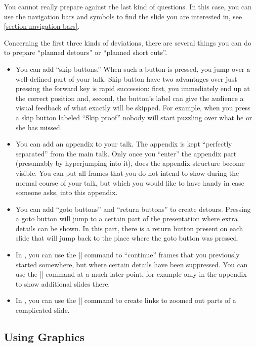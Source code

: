 You cannot really prepare against the last kind of questions. In this case, you can use the navigation bars and symbols to find the slide you are interested in, see \ref{section-navigation-bars}.

Concerning the first three kinds of deviations, there are several things you can do to prepare ``planned detours'' or ``planned short cuts''.
\begin{itemize}
\item
  You can add ``skip buttons.'' When such a button is pressed, you jump over a well-defined part of your talk. Skip button have two advantages over just pressing the forward key is rapid succession: first, you immediately end up at the correct position and, second, the button's label can give the audience a visual feedback of what exactly will be skipped. For example, when you press a skip button labeled ``Skip proof'' nobody will start puzzling over what he or she has missed.
\item
  You can add an appendix to your talk. The appendix is kept ``perfectly separated'' from the main talk. Only once you ``enter'' the appendix part (presumably by hyperjumping into it), does the appendix structure become visible. You can put all frames that you do not intend to show during the normal course of your talk, but which you would like to have handy in case someone asks, into this appendix.
\item
  You can add ``goto buttons'' and ``return buttons'' to create detours. Pressing a goto button will jump to a certain part of the presentation where extra details can be shown. In this part, there is a return button present on each slide that will jump back to the place where the goto button was pressed.
\item
  In \beamer, you can use the |\againframe| command to ``continue'' frames that you previously started somewhere, but where certain details have been suppressed. You can use the |\againframe| command at a much later point, for example only in the appendix to show additional slides there.
\item
  In \beamer, you can use the |\framezoom| command to create links to zoomed out parts of a complicated slide.
\end{itemize}

\subsection{Using Graphics}

